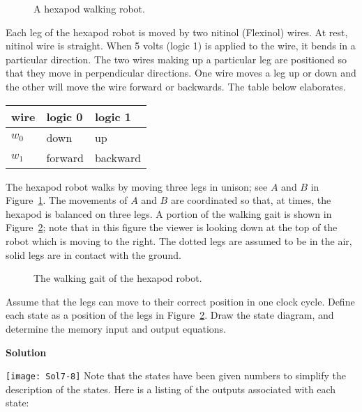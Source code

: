 \begin{enumerate}
        \begin{figure}[ht]
            \caption{A hexapod walking robot.}
            \label{fig:hexapod}
        \end{figure}

        Each leg of the hexapod robot is moved by two nitinol (Flexinol) wires.
        At rest, nitinol wire is straight.  When 5 volts (logic 1) is applied to
        the wire, it bends in a particular direction.  The two wires making up
        a particular leg are positioned so that they move in perpendicular
        directions.  One wire moves a leg up or down and the other will move
        the wire forward or backwards.  The table below elaborates.

        \begin{tabular}{l|l|l}
            wire   & logic 0 & logic 1    \\ \hline
            $w_0$  & down     & up        \\ \hline
            $w_1$  & forward & backward    \\
        \end{tabular}

        The hexapod robot walks by moving three legs in unison; see $A$ and
        $B$ in Figure~\ref{fig:hexapod}.  The movements of $A$ and $B$ are
        coordinated so that, at times, the hexapod is balanced on three legs.
        A portion of the walking gait is shown in Figure~\ref{fig:hexgate};
        note that in this figure the viewer is looking down at the top of the
        robot which is moving to the right.  The dotted legs are assumed to be in
        the air, solid legs are in contact with the ground.

        \begin{figure}[ht]
            \caption{The walking gait of the hexapod robot.}
            \label{fig:hexgate}
        \end{figure}

        Assume that the legs can move to their correct position in one clock
        cycle.  Define each state as a position of the legs in
        Figure~\ref{fig:hexgate}. Draw the state diagram,
        and determine the memory input and output equations.

        \begin{onlysolution}\filbreak  \textbf{Solution} \itshape{

                \texttt{[image: Sol7-8]}
                Note that the states have been given numbers to simplify the
                description of the states.  Here is a listing of the outputs
                associated with each state:

}
\end{onlysolution}
\end{enumerate}
